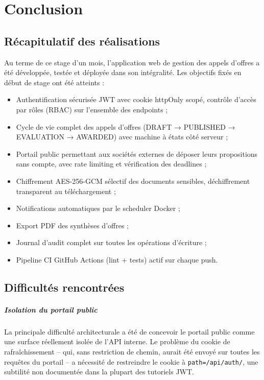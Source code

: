 \chapter*{Conclusion}

\section*{Récapitulatif des réalisations}

Au terme de ce stage d'un mois, l'application web de gestion des appels d'offres
a été développée, testée et déployée dans son intégralité. Les objectifs fixés en
début de stage ont été atteints :

\begin{itemize}
    \item Authentification sécurisée JWT avec cookie httpOnly scopé,
    contrôle d'accès par rôles (RBAC) sur l'ensemble des endpoints ;
    \item Cycle de vie complet des appels d'offres (DRAFT → PUBLISHED → EVALUATION
    → AWARDED) avec machine à états côté serveur ;
    \item Portail public permettant aux sociétés externes de déposer leurs propositions
    sans compte, avec rate limiting et vérification des deadlines ;
    \item Chiffrement AES-256-GCM sélectif des documents sensibles,
    déchiffrement transparent au téléchargement ;
    \item Notifications automatiques par le scheduler Docker ;
    \item Export PDF des synthèses d'offres ;
    \item Journal d'audit complet sur toutes les opérations d'écriture ;
    \item Pipeline CI GitHub Actions (lint + tests) actif sur chaque push.
\end{itemize}

\section*{Difficultés rencontrées}

\paragraph{Isolation du portail public} La principale difficulté architecturale
a été de concevoir le portail public comme une surface réellement isolée de l'API
interne. Le problème du cookie de rafraîchissement -- qui, sans restriction de chemin,
aurait été envoyé sur toutes les requêtes du portail -- a nécessité de restreindre
le cookie à \texttt{path=/api/auth/}, une subtilité non documentée dans la plupart
des tutoriels JWT.

